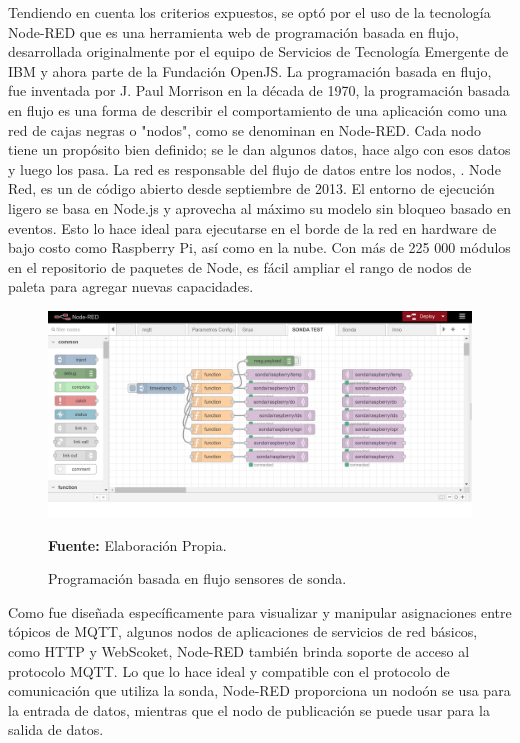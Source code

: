 Tendiendo en cuenta los criterios expuestos, se opt\'o por el uso de la tecnolog\'ia Node-RED que es una herramienta web de programación basada en flujo, desarrollada originalmente por el equipo de Servicios de Tecnología Emergente de IBM y ahora parte de la Fundación OpenJS.
La programaci\'on basada en flujo, fue inventada por J. Paul Morrison en la década de 1970, la programaci\'on basada en flujo es una forma de describir el comportamiento de una aplicación como una red de cajas negras o "nodos", como se denominan en Node-RED. Cada nodo tiene un prop\'osito bien definido; se le dan algunos datos, hace algo con esos datos y luego los pasa. La red es responsable del flujo de datos entre los nodos, \cite{noauthor_about_nodate}.
Node Red, es un de código abierto desde septiembre de 2013. El entorno de ejecución ligero se basa en Node.js y aprovecha al máximo su modelo sin bloqueo basado en eventos. Esto lo hace ideal para ejecutarse en el borde de la red en hardware de bajo costo como Raspberry Pi, así como en la nube. Con más de 225 000 módulos en el repositorio de paquetes de Node, es fácil ampliar el rango de nodos de paleta para agregar nuevas capacidades.

\begin{figure}[H]
    \centering
    \includegraphics[width=0.75\linewidth]{Imagenes/cap3/flujoNode_red.png}
    \caption {Programaci\'on basada en flujo sensores de sonda. }{\textbf{Fuente:}
    Elaboraci\'on Propia. }
    \label{fig:M1CE}
\end{figure}

Como fue dise\~nada espec\'ificamente para visualizar y manipular asignaciones entre t\'opicos de MQTT, algunos nodos de aplicaciones de servicios de red b\'asicos, como HTTP y WebScoket, Node-RED tambi\'en brinda soporte de acceso al protocolo MQTT. 
Lo que lo hace ideal y compatible con el protocolo de comunicaci\'on que utiliza la sonda, Node-RED proporciona un nodo\'on se usa para la entrada de datos, mientras que el nodo de publicaci\'on se puede usar para la salida de datos.
